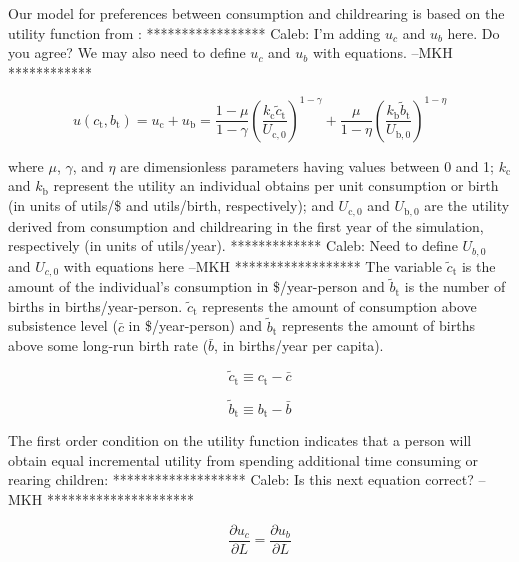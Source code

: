 \documentclass[letterpaper,12pt]{article}
\begin{document}
Our model for preferences between consumption and childrearing is based on the utility function from \citet{Jones2001}: ***************** Caleb: I'm adding $u_c$ and $u_b$ here. Do you agree? We may also need to define $u_c$ and $u_b$ with equations.  --MKH ************

\begin{equation} \label{eq:utility_function}
	u(c_\mathrm{t}, b_\mathrm{t}) = u_\mathrm{c} + u_\mathrm{b} = \frac{1-\mu}{1-\gamma} \left(\frac{k_\mathrm{c} \tilde c_\mathrm{t}}{U_\mathrm{c,0}} \right)^{1-\gamma} + \frac{\mu}{1-\eta} \left(\frac{k_\mathrm{b} \tilde b_\mathrm{t}}{U_\mathrm{b,0}} \right)^{1-\eta}
\end{equation}

\noindent where $\mu$, $\gamma$, and $\eta$ are dimensionless parameters having values between 0 and 1; $k_\mathrm{c}$ and $k_\mathrm{b}$ represent the utility an individual obtains per unit consumption or birth (in units of utils/\$ and utils/birth, respectively); and $U_{\mathrm{c,0}}$ and $U_{\mathrm{b,0}}$ are the utility derived from consumption and childrearing in the first year of the simulation, respectively (in units of utils/year). ************* Caleb: Need to define $U_{b,0}$ and $U_{c,0}$ with equations here --MKH ****************** The variable $\tilde c_\mathrm{t}$ is the amount of the individual's consumption in \$/year-person and $\tilde b_\mathrm{t}$ is the number of births in births/year-person. $\tilde c_\mathrm{t}$ represents the amount of consumption above subsistence level ($\bar c$ in \$/year-person) and $\tilde b_\mathrm{t}$ represents the amount of births above some long-run birth rate ($\bar b$, in births/year per capita).

\begin{equation} \label{eq:c_tilde}
	\tilde c_\mathrm{t} \equiv c_\mathrm{t} - \bar c
\end{equation}

\begin{equation} \label{eq:b_tilde}
	\tilde b_\mathrm{t} \equiv b_\mathrm{t} - \bar b
\end{equation}

The first order condition on the utility function indicates that a person will obtain equal incremental utility from spending additional time consuming or rearing children: ******************* Caleb: Is this next equation correct? --MKH *********************

\begin{equation} \label{eq:first_order_condition_def}
	\frac{\partial u_{c}}{\partial L} = \frac{\partial u_{b}}{\partial L}
\end{equation}
\end{document}
